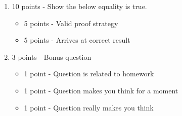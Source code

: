 \documentclass[12pt]{article}
\begin{document}
\begin{enumerate}[font=\bfseries]
\begin{itemize}
        \end{itemize}
    \item 10 points - Show the below equality is true.
        \begin{itemize}
            \item 5 points - Valid proof strategy
            \item 5 points - Arrives at correct result
        \end{itemize}
    \item 3 points - Bonus question
        \begin{itemize}
            \item 1 point - Question is related to homework
            \item 1 point - Question makes you think for a moment
            \item 1 point - Question really makes you think
        \end{itemize}
\end{enumerate}
\end{document}
